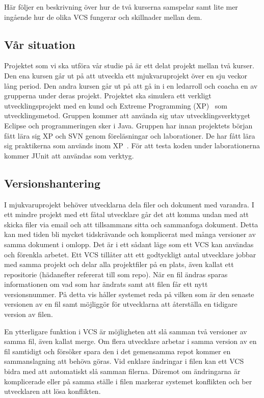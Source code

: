 Här följer en beskrivning över hur de två kurserna samspelar samt lite mer ingående hur de olika VCS fungerar och skillnader mellan dem.
\subsection{Vår situation}

Projektet som vi ska utföra vår studie på är ett delat projekt mellan två kurser. Den ena kursen går ut på att utveckla ett mjukvaruprojekt över en sju veckor lång period. Den andra kursen går ut på att gå in i en ledarroll och coacha en av grupperna under deras projekt. Projektet ska simulera ett verkligt utvecklingsprojekt med en kund och Extreme Programming (XP)~\cite{BeckXP} som utvecklingsmetod. Gruppen kommer att använda sig utav utvecklingsverktyget Eclipse och programmeringen sker i Java. Gruppen har innan projektets början fått lära sig XP och SVN genom föreläsningar och laborationer. De har fått lära sig praktikerna som används inom XP~\cite{BeckXP}. För att testa koden under laborationerna kommer JUnit att användas som verktyg. 


\subsection{Versionshantering}

I mjukvaruprojekt behöver utvecklarna dela filer och dokument med varandra. I ett mindre projekt med ett fåtal utvecklare går det att komma undan med att skicka filer via email och att tillsammans sitta och sammanfoga dokument. Detta kan med tiden bli mycket tidskrävande och komplicerat med många versioner av samma dokument i omlopp. Det är i ett sådant läge som ett VCS kan användas och förenkla arbetet. Ett VCS tillåter att ett godtyckligt antal utvecklare jobbar med samma projekt och delar alla projektfiler på en plats, även kallat ett repositorie (hädanefter refererat till som repo). När en fil ändras sparas informationen om vad som har ändrats samt att filen får ett nytt versionsnummer. På detta vis håller systemet reda på vilken som är den senaste versionen av en fil samt möjliggör för utvecklarna att återställa en tidigare version av filen.

En ytterligare funktion i VCS är möjligheten att slå samman två versioner av samma fil, även kallat merge. Om flera utvecklare arbetar i samma version av en fil samtidigt och försöker spara den i det gemensamma repot kommer en sammanslagning att behöva göras. Vid enklare ändringar i filen kan ett VCS bidra med att automatiskt slå samman filerna. Däremot om ändringarna är komplicerade eller på samma ställe i filen markerar systemet konflikten och ber utvecklaren att lösa konflikten.

